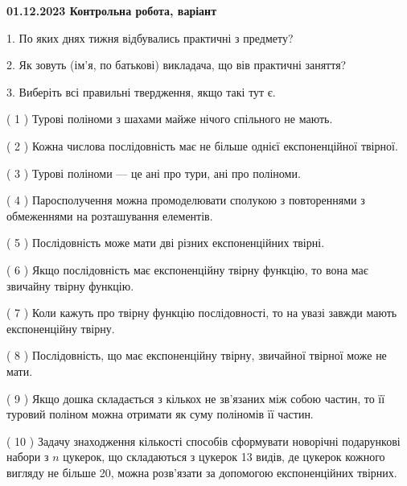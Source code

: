 \documentclass[12pt, ukrainian]{article}
\begin{document}
\vspace{4mm}
\newpage
\begin {large}

\textbf{01.12.2023 Контрольна робота, варіант  }\par


{
1. По яких днях тижня відбувались практичні з предмету?



\vspace{5mm}
2. Як зовуть (ім'я, по батькові) викладача, що вів практичні заняття?



\vspace{5mm}
3. Виберіть всі правильні твердження, якщо такі тут є.\par
\vspace{2mm}
( 1 ) Турові поліноми з шахами майже нічого спільного не мають.%

( 2 ) Кожна числова послідовність має не більше однієї  експоненційної твірної.%

( 3 ) Турові поліноми --- це ані про тури, ані про поліноми.%

( 4 ) Паросполучення можна промоделювати сполукою з повтореннями з обмеженнями на розташування елементів.%

( 5 ) Послідовність може мати дві різних експоненційних твірні.%

( 6 ) Якщо послідовність має експоненційну твірну функцію, то вона має звичайну твірну функцію.%

( 7 ) Коли кажуть про твірну функцію послідовності, то на увазі завжди мають експоненційну твірну.%

( 8 ) Послідовність, що має експоненційну твірну, звичайної твірної може не мати.%

( 9 ) Якщо дошка складається з кількох не зв’язаних між собою частин, то її туровий поліном можна отримати як суму поліномів її частин.%

( 10 ) Задачу знаходження кількості способів сформувати новорічні подарункові набори з $n$ цукерок, що складаються з цукерок 13 видів, де цукерок кожного вигляду не більше 20, можна розв’язати за допомогою експоненційних твірних.%
}
\end {large}
\end{document}
